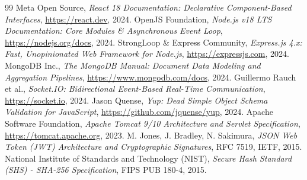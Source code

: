 \documentclass[12pt,a4paper,oneside]{report}
\begin{document}
\begin{thebibliography}{99}
 Meta Open Source, \textit{React 18 Documentation: Declarative Component-Based Interfaces}, \url{https://react.dev}, 2024.
 OpenJS Foundation, \textit{Node.js v18 LTS Documentation: Core Modules \& Asynchronous Event Loop}, \url{https://nodejs.org/docs}, 2024.
 StrongLoop \& Express Community, \textit{Express.js 4.x: Fast, Unopinionated Web Framework for Node.js}, \url{https://expressjs.com}, 2024.
 MongoDB Inc., \textit{The MongoDB Manual: Document Data Modeling and Aggregation Pipelines}, \url{https://www.mongodb.com/docs}, 2024.
 Guillermo Rauch et al., \textit{Socket.IO: Bidirectional Event-Based Real-Time Communication}, \url{https://socket.io}, 2024.
 Jason Quense, \textit{Yup: Dead Simple Object Schema Validation for JavaScript}, \url{https://github.com/jquense/yup}, 2024.
 Apache Software Foundation, \textit{Apache Tomcat 9/10 Architecture and Servlet Specification}, \url{https://tomcat.apache.org}, 2023.
 M. Jones, J. Bradley, N. Sakimura, \textit{JSON Web Token (JWT) Architecture and Cryptographic Signatures}, RFC 7519, IETF, 2015.
 National Institute of Standards and Technology (NIST), \textit{Secure Hash Standard (SHS) - SHA-256 Specification}, FIPS PUB 180-4, 2015.
\end{thebibliography}
\end{document}
